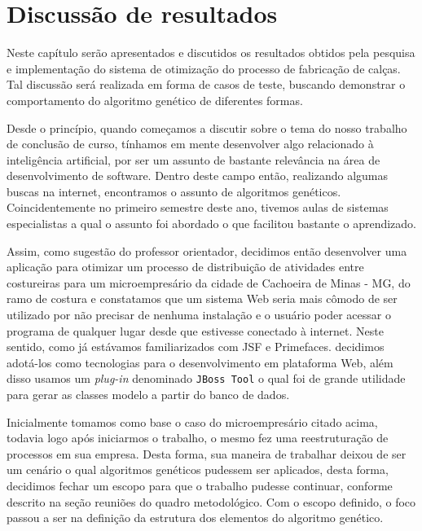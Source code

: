 \chapter{Discussão de resultados}

\par Neste capítulo serão apresentados e discutidos os resultados obtidos pela pesquisa e implementação 
do sistema de otimização do processo de fabricação de calças. Tal discussão será realizada em forma de
casos de teste, buscando demonstrar o comportamento do algoritmo genético de diferentes formas.

\par Desde o princípio, quando começamos a discutir sobre o tema do nosso trabalho de conclusão de curso, tínhamos em mente
desenvolver algo relacionado à inteligência artificial, por ser um assunto de bastante relevância na área de desenvolvimento
de software. Dentro deste campo então, realizando algumas buscas na internet, encontramos o assunto de algoritmos genéticos.
Coincidentemente no primeiro semestre deste ano, tivemos aulas de sistemas especialistas a qual o assunto foi abordado o que facilitou bastante o aprendizado. 

\par Assim, como sugestão do professor orientador, decidimos então desenvolver
uma aplicação para otimizar um processo de distribuição de atividades entre
costureiras para um microempresário da cidade de Cachoeira de Minas - MG, do ramo de costura e constatamos que um sistema Web seria mais cômodo de ser utilizado por não precisar de nenhuma instalação e o usuário poder
acessar o programa de qualquer lugar desde que estivesse conectado à internet.
Neste sentido, como já estávamos familiarizados com JSF e Primefaces. decidimos
adotá-los como tecnologias para o desenvolvimento em plataforma Web, além disso usamos um \textit{plug-in} denominado \texttt{JBoss Tool} o qual foi de grande utilidade para gerar as classes modelo a partir do 
banco de dados.

\par Inicialmente tomamos como base o caso do microempresário citado acima, todavia logo após iniciarmos o trabalho, o mesmo fez uma 
reestruturação de processos em sua empresa. Desta forma, sua maneira de trabalhar deixou de ser um cenário o qual algoritmos genéticos
pudessem ser aplicados, desta forma, decidimos fechar um escopo para que o trabalho pudesse continuar, conforme descrito na seção 
reuniões do quadro metodológico. Com o escopo definido, o foco passou a ser na definição da estrutura dos elementos do algoritmo genético. 

